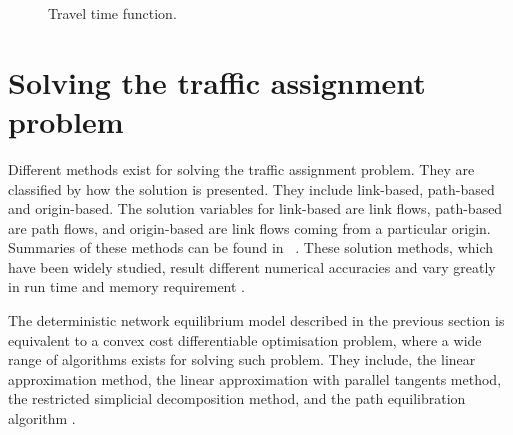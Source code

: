 \begin{figure}[!ht]
    \centering
    \caption{Travel time function.}
    \label{fig:flowfunction}
\end{figure}

\section{Solving the traffic assignment problem}
Different methods exist for solving the traffic assignment problem.
They are classified by how the solution is presented.
They include link-based, path-based and origin-based.
The solution variables for link-based are link flows,
path-based are path flows,
and origin-based are link flows coming from a particular origin.
Summaries of these methods can be found in ~\citet{Zhou2010}.
These solution methods, which have been widely studied,
result different numerical accuracies and vary greatly in run time and memory requirement \citep{Olga2013}.

The deterministic network equilibrium model described in the previous section is equivalent to a convex cost differentiable optimisation problem,
where a wide range of algorithms exists for solving such problem.
They include, the linear approximation method,
the linear approximation with parallel tangents method,
the restricted simplicial decomposition method,
and the path equilibration algorithm \citep{Florian}.

